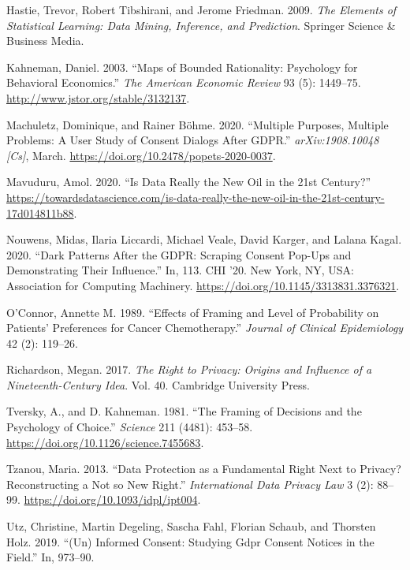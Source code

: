 \documentclass[
  11pt,
  letterpaper,
]{article}
\newlength{\cslhangindent}
\newlength{\cslentryspacingunit} %
\newenvironment{CSLReferences}[2] %
 {%
  \setlength{\parindent}{0pt}
  \ifodd #1
  \let\oldpar\par
  \def\par{\hangindent=\cslhangindent\oldpar}
  \fi
  \setlength{\parskip}{#2\cslentryspacingunit}
 }%
 {}
\begin{document}
\begin{CSLReferences}{1}{0}
\leavevmode{}%
Hastie, Trevor, Robert Tibshirani, and Jerome Friedman. 2009. \emph{The Elements of Statistical Learning: Data Mining, Inference, and Prediction}. Springer Science \& Business Media.

\leavevmode{}%
Kahneman, Daniel. 2003. {``Maps of Bounded Rationality: Psychology for Behavioral Economics.''} \emph{The American Economic Review} 93 (5): 1449--75. \url{http://www.jstor.org/stable/3132137}.

\leavevmode{}%
Machuletz, Dominique, and Rainer Böhme. 2020. {``Multiple Purposes, Multiple Problems: A User Study of Consent Dialogs After GDPR.''} \emph{arXiv:1908.10048 {[}Cs{]}}, March. \url{https://doi.org/10.2478/popets-2020-0037}.

\leavevmode{}%
Mavuduru, Amol. 2020. {``Is Data Really the New Oil in the 21st Century?''} \url{https://towardsdatascience.com/is-data-really-the-new-oil-in-the-21st-century-17d014811b88}.

\leavevmode{}%
Nouwens, Midas, Ilaria Liccardi, Michael Veale, David Karger, and Lalana Kagal. 2020. {``Dark Patterns After the GDPR: Scraping Consent Pop-Ups and Demonstrating Their Influence.''} In, 113. CHI '20. New York, NY, USA: Association for Computing Machinery. \url{https://doi.org/10.1145/3313831.3376321}.

\leavevmode{}%
O'Connor, Annette M. 1989. {``Effects of Framing and Level of Probability on Patients' Preferences for Cancer Chemotherapy.''} \emph{Journal of Clinical Epidemiology} 42 (2): 119--26.

\leavevmode{}%
Richardson, Megan. 2017. \emph{The Right to Privacy: Origins and Influence of a Nineteenth-Century Idea}. Vol. 40. Cambridge University Press.

\leavevmode{}%
Tversky, A., and D. Kahneman. 1981. {``The Framing of Decisions and the Psychology of Choice.''} \emph{Science} 211 (4481): 453--58. \url{https://doi.org/10.1126/science.7455683}.

\leavevmode{}%
Tzanou, Maria. 2013. {``Data Protection as a Fundamental Right Next to Privacy? Reconstructing a Not so New Right.''} \emph{International Data Privacy Law} 3 (2): 88--99. \url{https://doi.org/10.1093/idpl/ipt004}.

\leavevmode{}%
Utz, Christine, Martin Degeling, Sascha Fahl, Florian Schaub, and Thorsten Holz. 2019. {``(Un) Informed Consent: Studying Gdpr Consent Notices in the Field.''} In, 973--90.

\end{CSLReferences}
\end{document}
